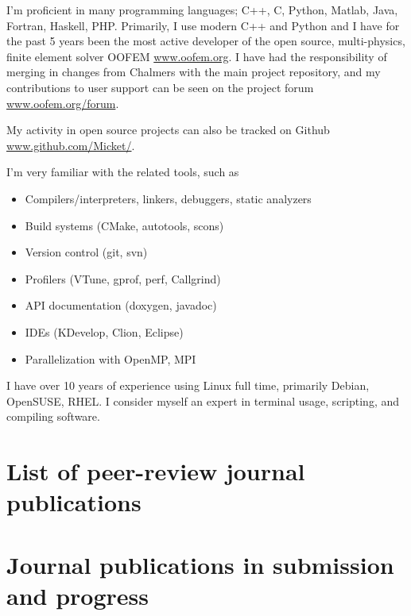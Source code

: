 \documentclass[a4paper,10pt]{article} %
\begin{document}
{I'm proficient in many programming languages; C++, C, Python, Matlab, Java, Fortran, Haskell, PHP.
Primarily, I use modern C++ and Python and I have for the past 5 years been the most active developer of the open source, multi-physics, finite element solver OOFEM \url{www.oofem.org}. I have had the responsibility of merging in changes from Chalmers with the main project repository, and my contributions to user support can be seen on the project forum \url{www.oofem.org/forum}.

My activity in open source projects can also be tracked on Github \url{www.github.com/Micket/}.

I'm very familiar with the related tools, such as
\begin{itemize}
 \item Compilers/interpreters, linkers, debuggers, static analyzers
 \item Build systems (CMake, autotools, scons)
 \item Version control (git, svn)
 \item Profilers (VTune, gprof, perf, Callgrind)
 \item API documentation (doxygen, javadoc)
 \item IDEs (KDevelop, Clion, Eclipse)
 \item Parallelization with OpenMP, MPI
\end{itemize}

I have over 10 years of experience using Linux full time, primarily Debian, OpenSUSE, RHEL.
I consider myself an expert in terminal usage, scripting, and compiling software.


\section{List of peer-review journal publications}




\section{Journal publications in submission and progress}



}
\end{document}
